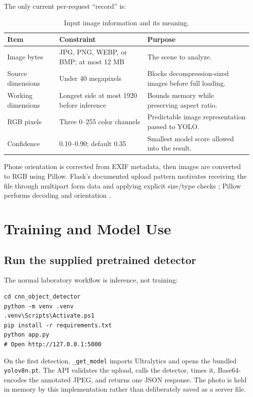\documentclass[12pt,a4paper,openany]{report}
\begin{document}
The only current per-request ``record'' is:
\begin{table}[H]
\centering
\caption{Input image information and its meaning.}
\begin{tabularx}{\textwidth}{p{}p{}Y}
\toprule
\textbf{Item} & \textbf{Constraint} & \textbf{Purpose} \\
\midrule
Image bytes & JPG, PNG, WEBP, or BMP; at most 12 MB & The scene to analyze. \\
Source dimensions & Under 40 megapixels & Blocks decompression-sized images before full loading. \\
Working dimensions & Longest side at most 1920 before inference & Bounds memory while preserving aspect ratio. \\
RGB pixels & Three 0--255 color channels & Predictable image representation passed to YOLO. \\
Confidence & 0.10--0.90; default 0.35 & Smallest model score allowed into the result. \\
\bottomrule
\end{tabularx}
\end{table}
Phone orientation is corrected from EXIF metadata, then images are converted to
RGB using Pillow. Flask's documented upload pattern motivates receiving the
file through multipart form data and applying explicit size/type checks
\cite{flaskUpload}; Pillow performs decoding and orientation \cite{pillow}.

\section{Training and Model Use}
\subsection{Run the supplied pretrained detector}
The normal laboratory workflow is inference, not training:
\begin{lstlisting}[style=terminal]
cd cnn_object_detector
python -m venv .venv
.venv\Scripts\Activate.ps1
pip install -r requirements.txt
python app.py
# Open http://127.0.0.1:5000
\end{lstlisting}
On the first detection, \texttt{\_get\_model} imports Ultralytics and opens the
bundled \texttt{yolov8n.pt}. The API validates the upload, calls the detector,
times it, Base64-encodes the annotated JPEG, and returns one JSON response. The
photo is held in memory by this implementation rather than deliberately saved
as a server file.
\end{document}

